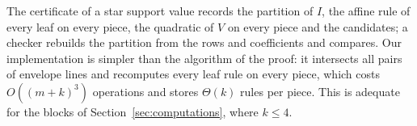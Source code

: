 The certificate of a star support value records the partition of $I$,
the affine rule of every leaf on every piece, the quadratic of $V$ on
every piece and the candidates; a checker rebuilds the partition from the
rows and coefficients and compares. Our implementation is simpler than
the algorithm of the proof: it intersects all pairs of envelope lines and
recomputes every leaf rule on every piece, which costs $O((m+k)^3)$
operations and stores $\Theta(k)$ rules per piece. This is adequate for the
blocks of Section~\ref{sec:computations}, where $k\le4$.
